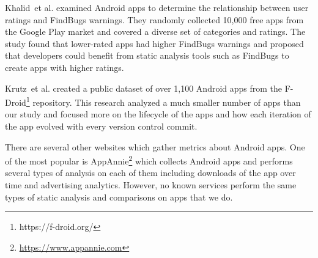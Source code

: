 \documentclass{sig-alternate}
\begin{document}




Khalid~et al.\cite{7006337} examined Android apps to determine the relationship between user ratings and FindBugs warnings. They randomly collected 10,000 free apps from the Google Play market and covered a diverse set of categories and ratings. The study found that lower-rated apps had higher FindBugs warnings and proposed that developers could benefit from static analysis tools such as FindBugs to create apps with higher ratings.


Krutz~et al.\cite{krutz2015FDroid} created a public dataset of over 1,100 Android apps from the F-Droid\footnote{https://f-droid.org/} repository. This research analyzed a much smaller number of apps than our study and focused more on the lifecycle of the apps and how each iteration of the app evolved with every version control commit.

There are several other websites which gather metrics about Android apps. One of the most popular is AppAnnie\footnote{\url{https://www.appannie.com}} which collects Android apps and performs several types of analysis on each of them including downloads of the app over time and advertising analytics. However, no known services perform the same types of static analysis and comparisons on apps that we do.
\end{document}
